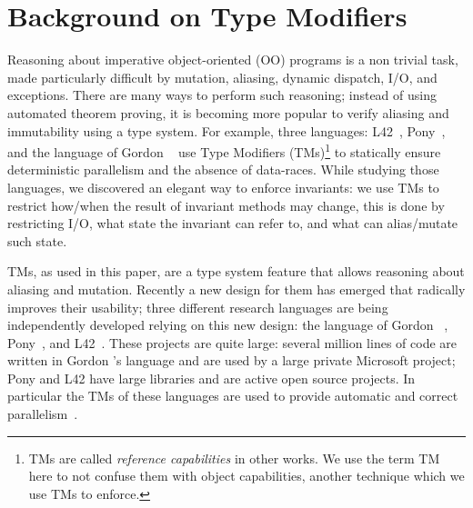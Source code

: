 \section{Background on Type Modifiers}
\label{s:TMsAndOCs}
Reasoning about imperative object-oriented (OO) programs is a non trivial task,
made particularly difficult by mutation, aliasing, dynamic dispatch, I/O, and exceptions. There are many ways to perform such reasoning;
instead of using automated theorem proving, 
it is becoming more popular to verify aliasing and immutability using a type system.
For example, three languages: L42~\cite{ServettoZucca15,ServettoEtAl13a,JOT:issue_2011_01/article1,GianniniEtAl16}, Pony~\cite{clebsch2015deny,clebsch2017orca}, and the language of Gordon \etal~\cite{GordonEtAl12} use Type Modifiers (TMs)\footnote{TMs are called \emph{reference capabilities} in other works. We use the term TM here
		to not confuse them with object capabilities, another technique which we use TMs to enforce.} to statically ensure  deterministic parallelism and the absence of data-races.
While studying those languages, we discovered an elegant way to enforce invariants: we use TMs to restrict how/when the result of invariant methods may change, this is done by restricting I/O, what state the invariant can refer to, and what can alias/mutate such state.


TMs, as used in this paper, are a type system feature that allows reasoning about aliasing and mutation. Recently a new design for them has emerged that radically improves their usability;
three different research languages are being independently developed relying on this new design: the language of Gordon \etal~\cite{GordonEtAl12}, Pony~\cite{clebsch2015deny,clebsch2017orca}, and L42~\cite{ServettoZucca15,ServettoEtAl13a,JOT:issue_2011_01/article1,GianniniEtAl16}.
These projects are quite large: several million lines of code are written in Gordon \etal's language and are used by a large private Microsoft project; Pony and L42 have large libraries and are active open source projects. In particular the TMs of these languages are used to provide automatic and correct parallelism~\cite{GordonEtAl12,clebsch2015deny,clebsch2017orca,ServettoEtAl13a}.

